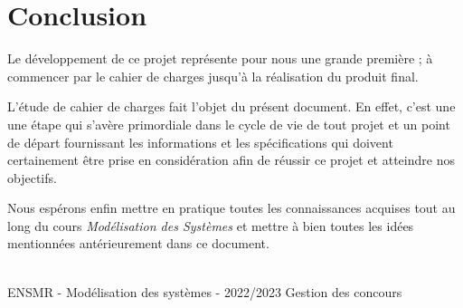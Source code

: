 \section{Conclusion}

Le développement de ce projet représente pour nous une grande première ; à commencer par le cahier de charges jusqu'à la réalisation du produit final.\par
L’étude de cahier de charges fait l'objet du présent document. En effet, c'est une une étape qui s'avère  primordiale dans le cycle de vie de tout projet et un point de départ fournissant les informations et les spécifications qui doivent certainement être prise en considération afin de réussir ce projet et atteindre nos objectifs.\par

 Nous espérons enfin mettre en pratique toutes les connaissances acquises tout au long du cours \emph{Modélisation des Systèmes} et mettre à bien toutes les idées mentionnées antérieurement dans ce document. 


\vfill
\noindent\makebox[\linewidth]{\rule{.8\paperwidth}{.6pt}}\\[0.2cm]
ENSMR - Modélisation des systèmes - 2022/2023 \hfill Gestion des concours
\noindent\makebox[\linewidth]{\rule{.8\paperwidth}{.6pt}}

\newpage